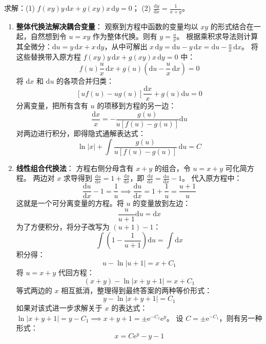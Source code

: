 \documentclass[lang=cn,11pt]{elegantbook}
\begin{document}
\begin{exercise}
求解：(1) $f(xy)y\,\mathrm{d}x+g(xy)x\,\mathrm{d}y=0$；
\quad (2) $\displaystyle\frac{\mathrm{d}y}{\mathrm{d}x}=\frac{1}{x+y}$。
\end{exercise}
\begin{solution}
\begin{enumerate}
    \item[\textbf{(1)}] \textbf{整体代换法解决耦合变量}：
    观察到方程中函数的变量均以 $xy$ 的形式结合在一起，自然想到令 $u = xy$ 作为整体代换。则有 $y = \frac{u}{x}$。
    根据乘积求导法则计算其全微分：$\mathrm{d}u = y\,\mathrm{d}x + x\,\mathrm{d}y$，从中可解出 $x\,\mathrm{d}y = \mathrm{d}u - y\,\mathrm{d}x = \mathrm{d}u - \frac{u}{x}\,\mathrm{d}x$。
    将这些替换带入原方程 $f(xy)y\,\mathrm{d}x + g(xy)x\,\mathrm{d}y = 0$ 中：
    \[
    f(u)\frac{u}{x}\,\mathrm{d}x + g(u)\left(\mathrm{d}u - \frac{u}{x}\,\mathrm{d}x\right) = 0
    \]
    将 $\mathrm{d}x$ 和 $\mathrm{d}u$ 的各项合并归类：
    \[
    \left[ u f(u) - u g(u) \right] \frac{\mathrm{d}x}{x} + g(u)\mathrm{d}u = 0
    \]
    分离变量，把所有含有 $u$ 的项移到方程的另一边：
    \[
    \frac{\mathrm{d}x}{x} = - \frac{g(u)}{u[f(u)-g(u)]}\mathrm{d}u
    \]
    对两边进行积分，即得隐式通解表达式：
    \[
    \ln|x| + \int \frac{g(u)}{u[f(u)-g(u)]}\,\mathrm{d}u = C
    \]
    
    \item[\textbf{(2)}] \textbf{线性组合代换法}：
    方程右侧分母含有 $x+y$ 的组合，令 $u = x+y$ 可化简方程。
    两边对 $x$ 求导得到 $\frac{\mathrm{d}u}{\mathrm{d}x} = 1 + \frac{\mathrm{d}y}{\mathrm{d}x}$，即 $\frac{\mathrm{d}y}{\mathrm{d}x} = \frac{\mathrm{d}u}{\mathrm{d}x} - 1$。
    代入原方程中：
    \[
    \frac{\mathrm{d}u}{\mathrm{d}x} - 1 = \frac{1}{u} \implies \frac{\mathrm{d}u}{\mathrm{d}x} = 1 + \frac{1}{u} = \frac{u+1}{u}
    \]
    这就是一个可分离变量的方程。将 $u$ 的变量放到左边：
    \[
    \frac{u}{u+1}\mathrm{d}u = \mathrm{d}x
    \]
    为了方便积分，将分子改写为 $(u+1)-1$：
    \[
    \int \left( 1 - \frac{1}{u+1} \right)\mathrm{d}u = \int \mathrm{d}x
    \]
    积分得：
    \[
    u - \ln|u+1| = x + C_1
    \]
    将 $u = x+y$ 代回方程：
    \[
    (x+y) - \ln|x+y+1| = x + C_1
    \]
    等式两边的 $x$ 相互抵消，整理得到最终答案的两种等价形式：
    \[
    \boxed{y-\ln|x+y+1|=C_1}
    \]
    如果对该式进一步求解关于 $x$ 的表达式：$\ln|x+y+1| = y - C_1 \implies x+y+1 = \pm\mathrm{e}^{-C_1}\mathrm{e}^y$。
    设 $C = \pm\mathrm{e}^{-C_1}$，则有另一种形式：
    \[
    \boxed{x=C\mathrm{e}^{y}-y-1}
    \]
\end{enumerate}
\end{solution}
\end{document}
